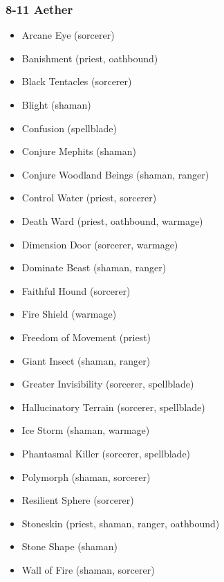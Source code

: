 \subsubsection{8-11 Aether}
\begin{itemize}
\item Arcane Eye (sorcerer)
\item Banishment (priest, oathbound)
\item Black Tentacles (sorcerer)
\item Blight (shaman)
\item Confusion (spellblade)
\item Conjure Mephits (shaman)
\item Conjure Woodland Beings (shaman, ranger)
\item Control Water (priest, sorcerer)
\item Death Ward (priest, oathbound, warmage)
\item Dimension Door (sorcerer, warmage)
\item Dominate Beast (shaman, ranger)
\item Faithful Hound (sorcerer)
\item Fire Shield (warmage)
\item Freedom of Movement (priest)
\item Giant Insect (shaman, ranger)
\item Greater Invisibility (sorcerer, spellblade)
\item Hallucinatory Terrain (sorcerer, spellblade)
\item Ice Storm (shaman, warmage)
\item Phantasmal Killer (sorcerer, spellblade)
\item Polymorph (shaman, sorcerer)
\item Resilient Sphere (sorcerer)
\item Stoneskin (priest, shaman, ranger, oathbound)
\item Stone Shape (shaman)
\item Wall of Fire (shaman, sorcerer)
\end{itemize}

